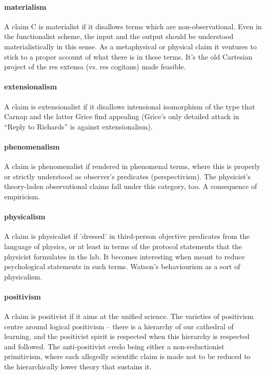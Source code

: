 \documentclass[10pt,titlepage]{book}
\begin{document}
\paragraph{materialism} A claim C is materialist if it disallows terms which are  
non-observational. Even in the functionalist scheme, the input and the output  
should be understood materialistically in this sense. As a metaphysical or  
physical claim it ventures to stick to a proper account of what there is in  
these terms. It's the old Cartesian project of the res extensa (vs. res  
cogitans) made feasible.
 
\paragraph{extensionalism} A claim is extensionalist if it disallows intensional  
isomorphism of the type that Carnap and the latter Grice find appealing (Grice's 
 only detailed attack in ``Reply to Richards'' is against extensionalism).
 
\paragraph{phenomenalism} A claim is phenomenalist if rendered in phenomenal terms,  
where this is properly or strictly understood as observer's predicates  
(perspectivism). The physicist's theory-laden observational claims fall under  
this category, too. A consequence of empiricism.
 
\paragraph{physicalism} A claim is physicalist if 'dressed' in third-person objective  
predicates from the language of physics, or at least in terms of the 
protocol  statements that the physicist formulates in the lab. It becomes 
interesting when  meant to reduce psychological statements in such terms. Watson's 
behaviourism as  a sort of physicalism.
 
\paragraph{positivism} A claim is positivist if it aims at the unified science. The  
varieties of positivism centre around logical positivism -- there is a 
hierarchy  of our cathedral of learning, and the positivist spirit is respected 
when this  hierarchy is respected and followed. The anti-positivist credo being 
either a  non-reductionist primitivism, where each allegedly scientific 
claim is made not  to be reduced to the hierarchically lower theory that 
sustains it.
\end{document}
